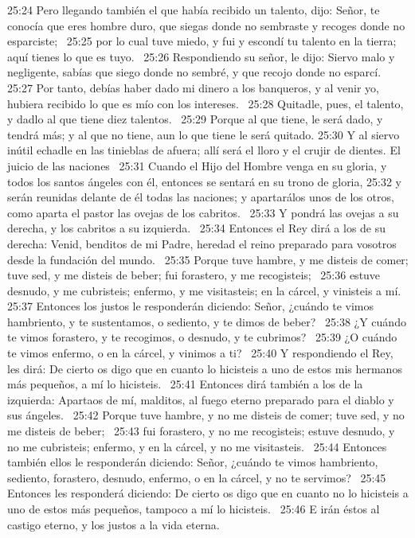 25:24 Pero llegando también el que había recibido un talento, dijo: Señor, te conocía que eres hombre duro, que siegas donde no sembraste y recoges donde no esparciste;  
25:25 por lo cual tuve miedo, y fui y escondí tu talento en la tierra; aquí tienes lo que es tuyo.  
25:26 Respondiendo su señor, le dijo: Siervo malo y negligente, sabías que siego donde no sembré, y que recojo donde no esparcí.  
25:27 Por tanto, debías haber dado mi dinero a los banqueros, y al venir yo, hubiera recibido lo que es mío con los intereses.  
25:28 Quitadle, pues, el talento, y dadlo al que tiene diez talentos.  
25:29 Porque al que tiene, le será dado, y tendrá más; y al que no tiene, aun lo que tiene le será quitado. 
25:30 Y al siervo inútil echadle en las tinieblas de afuera; allí será el lloro y el crujir de dientes. 
El juicio de las naciones  
25:31 Cuando el Hijo del Hombre venga en su gloria, y todos los santos ángeles con él, entonces se sentará en su trono de gloria, 
25:32 y serán reunidas delante de él todas las naciones; y apartarálos unos de los otros, como aparta el pastor las ovejas de los cabritos.  
25:33 Y pondrá las ovejas a su derecha, y los cabritos a su izquierda.  
25:34 Entonces el Rey dirá a los de su derecha: Venid, benditos de mi Padre, heredad el reino preparado para vosotros desde la fundación del mundo.  
25:35 Porque tuve hambre, y me disteis de comer; tuve sed, y me disteis de beber; fui forastero, y me recogisteis;  
25:36 estuve desnudo, y me cubristeis; enfermo, y me visitasteis; en la cárcel, y vinisteis a mí.  
25:37 Entonces los justos le responderán diciendo: Señor, ¿cuándo te vimos hambriento, y te sustentamos, o sediento, y te dimos de beber?  
25:38 ¿Y cuándo te vimos forastero, y te recogimos, o desnudo, y te cubrimos?  
25:39 ¿O cuándo te vimos enfermo, o en la cárcel, y vinimos a ti?  
25:40 Y respondiendo el Rey, les dirá: De cierto os digo que en cuanto lo hicisteis a uno de estos mis hermanos más pequeños, a mí lo hicisteis.  
25:41 Entonces dirá también a los de la izquierda: Apartaos de mí, malditos, al fuego eterno preparado para el diablo y sus ángeles.  
25:42 Porque tuve hambre, y no me disteis de comer; tuve sed, y no me disteis de beber;  
25:43 fui forastero, y no me recogisteis; estuve desnudo, y no me cubristeis; enfermo, y en la cárcel, y no me visitasteis.  
25:44 Entonces también ellos le responderán diciendo: Señor, ¿cuándo te vimos hambriento, sediento, forastero, desnudo, enfermo, o en la cárcel, y no te servimos?  
25:45 Entonces les responderá diciendo: De cierto os digo que en cuanto no lo hicisteis a uno de estos más pequeños, tampoco a mí lo hicisteis.  
25:46 E irán éstos al castigo eterno, y los justos a la vida eterna. 
